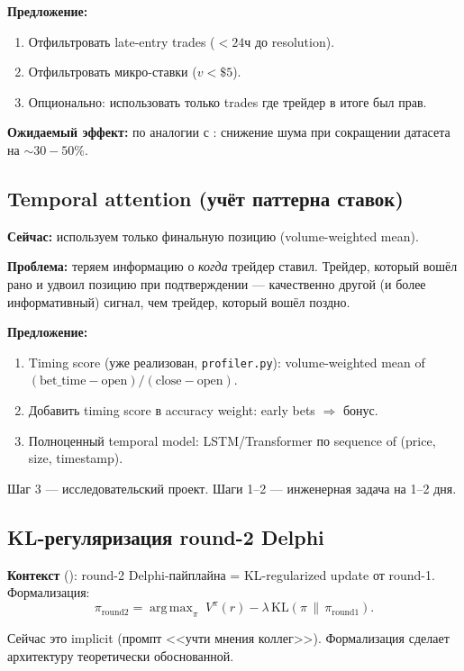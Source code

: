 \documentclass[a4paper, 11pt]{article}
\DeclareMathOperator*{\argmax}{arg\,max}
\begin{document}
\textbf{Предложение:}
\begin{enumerate}[nosep]
  \item Отфильтровать late-entry trades ($< 24$ч до resolution).
  \item Отфильтровать микро-ставки ($v < \$5$).
  \item Опционально: использовать только trades где трейдер в итоге был прав.
\end{enumerate}

\textbf{Ожидаемый эффект:} по аналогии с \citealt{attention_bc2024}:
снижение шума при сокращении датасета на ${\sim}30{-}50$\%.

\subsection{Temporal attention (учёт паттерна ставок)}

\textbf{Сейчас:} используем только финальную позицию (volume-weighted mean).

\textbf{Проблема:} теряем информацию о \emph{когда} трейдер ставил.
Трейдер, который вошёл рано и удвоил позицию при подтверждении ---
качественно другой (и более информативный) сигнал,
чем трейдер, который вошёл поздно.

\textbf{Предложение:}
\begin{enumerate}[nosep]
  \item Timing score (уже реализован, \texttt{profiler.py}):
    volume-weighted mean of $(\text{bet\_time} - \text{open}) / (\text{close} - \text{open})$.
  \item Добавить timing score в accuracy weight: early bets $\Rightarrow$ бонус.
  \item Полноценный temporal model: LSTM/Transformer по sequence of (price, size, timestamp).
\end{enumerate}

Шаг 3 --- исследовательский проект.
Шаги 1--2 --- инженерная задача на 1--2 дня.

\subsection{KL-регуляризация round-2 Delphi}

\textbf{Контекст} (\citealt{tiapkin2024demo}):
round-2 Delphi-пайплайна = KL-regularized update от round-1.
Формализация:
\[
\pi_{\mathrm{round2}} = \argmax_{\pi}\; V^{\pi}(r) - \lambda\,\mathrm{KL}(\pi \,\|\, \pi_{\mathrm{round1}}).
\]

Сейчас это implicit (промпт <<учти мнения коллег>>).
Формализация сделает архитектуру теоретически обоснованной.
\end{document}
